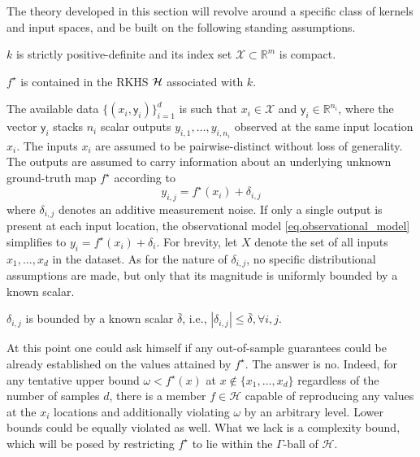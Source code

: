 The theory developed in this section will revolve around a specific class of kernels and input spaces, and be built on the following standing assumptions.

\begin{assumption}
	\label{as:kernel_spd_compact_X}
	 $k$ is strictly positive-definite and its index set $\mathcal{X} \subset \mathbb{R}^m$ is compact.
\end{assumption}

\begin{assumption}
	\label{as:rkhs_contains_gt}
	$f^\star$ is contained in the RKHS $\mathcal{H}$ associated with $k$.
\end{assumption}


The available data $\{(x_i,\mathsf{y}_i)\}_{i=1}^d$ is such that $x_i \in \mathcal{X}$ and $\mathsf{y}_i \in \mathbb{R}^{n_i}$, where the vector $\mathsf{y}_i$ stacks $n_i$ scalar outputs $y_{i,1}, \dots, y_{i,n_i}$ observed at the same input location $x_i$. The inputs $x_i$ are assumed to be pairwise-distinct without loss of generality. The outputs are assumed to carry information about an underlying unknown ground-truth map $f^\star$ according to
\begin{equation}
	\label{eq.observational_model}
	y_{i,j} = f^\star(x_i) + \delta_{i,j}
\end{equation}
where $\delta_{i,j}$ denotes an additive measurement noise. If only a single output is present at each input location, the observational model \eqref{eq.observational_model} simplifies to $y_{i} = f^\star(x_i) + \delta_{i}$. For brevity, let $X$ denote the set of all inputs $x_1,\dots,x_d$ in the dataset. As for the nature of $\delta_{i,j}$, no specific distributional assumptions are made, but only that its magnitude is uniformly bounded by a known scalar.

\begin{assumption}
	\label{as:noisebound}
	$\delta_{i,j}$ is bounded by a known scalar $\bar{\delta}$, i.e., $|\delta_{i,j}| \leq \bar \delta, \forall i,j$.
\end{assumption}

At this point one could ask himself if any out-of-sample guarantees could be already established on the values attained by $f^\star$. The answer is no. Indeed, for any tentative upper bound $\omega < f^\star(x)$ at $x \not \in \{x_1,\dots,x_d\}$ regardless of the number of samples $d$, there is a member $f \in \mathcal{H}$ capable of reproducing any values at the $x_i$ locations and additionally violating $\omega$ by an arbitrary level. Lower bounds could be equally violated as well. What we lack is a complexity bound, which will be posed by restricting $f^\star$ to lie within the $\Gamma$-ball of $\mathcal{H}$.


